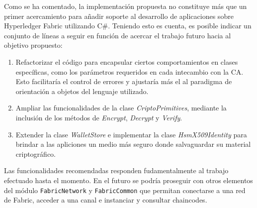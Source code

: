 \begin{recomendations}
Como se ha comentado, la implementaci\'on propuesta no constituye m\'as que un primer acercamiento para a\~nadir soporte al desarrollo de aplicaciones sobre Hyperledger Fabric utilizando C\#. Teniendo esto es cuenta, es posible indicar un conjunto de l\'ineas a seguir en funci\'on de acercar el trabajo futuro hacia al objetivo propuesto:

\begin{enumerate}
	\item Refactorizar el c\'odigo para encapsular ciertos comportamientos en clases espec\'ificas, como los par\'ametros requeridos en cada intecambio con la CA. Esto facilitar\'ia el control de errores y ajustar\'ia m\'as el al paradigma de orientaci\'on a objetos del lenguaje utilizado.
	
	\item Ampliar las funcionalidades de la clase \emph{CriptoPrimitives}, mediante la inclusi\'on de los m\'etodos de \emph{Encrypt}, \emph{Decrypt} y \emph{Verify}.
	
	\item Extender la clase \emph{WalletStore} e implementar la clase \emph{HsmX509Identity} para brindar a las apliciones un medio m\'as seguro donde salvaguardar su material criptogr\'afico.
\end{enumerate}

Las funcionalidades recomendadas responden fudamentalmente al trabajo efectuado hasta el momento. En el futuro se podr\'ia proseguir con otros elementos del m\'odulo \texttt{FabricNetwork} y \texttt{FabricCommon} que permitan conectarse a una red de Fabric, acceder a una canal e instanciar y consultar chaincodes.

\end{recomendations}
